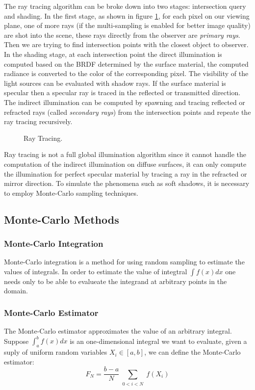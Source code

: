 The ray tracing algorithm can be broke down into two stages: intersection query and shading. In the first stage, as shown in figure \ref{fig:ray_tracing}, for each pixel on our viewing plane, one of more rays (if the multi-sampling is enabled for better image quality) are shot into the scene, these rays directly from the observer are \emph{primary rays}. Then we are trying to find intersection points with the closest object to observer. In the shading stage, at each intersection point the direct illumination is computed based on the BRDF determined by the surface material, the computed radiance is converted to the color of the corresponding pixel. The visibility of the light sources can be evaluated with shadow rays. If the surface material is specular then a specular ray is traced in the reflected or transmitted direction. The indirect illumination can be computed by spawning and tracing reflected or refracted rays (called \emph{secondary rays}) from the intersection points and repeate the ray tracing recursively. 

\begin{figure}[htp] 
    \centering 
    \renewcommand{\thefigure}{\thechapter.\arabic{figure}}
    \caption[]{Ray Tracing.}
    \label{fig:ray_tracing} 
\end{figure} 

Ray tracing is not a full global illumination algorithm since it cannot handle the computation of the indirect illumination on diffuse surfaces, it can only compute the illumination for perfect specular material by tracing a ray in the refracted or mirror direction. To simulate the phenomena such as soft shadows, it is necessary to employ Monte-Carlo sampling techniques. 

\subsection{Monte-Carlo Methods}

\subsubsection{Monte-Carlo Integration} 
Monte-Carlo integration is a method for using random sampling to estimate the values of integrals. In order to estimate the value of integtral \( \int f(x)dx \) one needs only to be able to evalueate the integrand at arbitrary points in the domain. 

\subsubsection{Monte-Carlo Estimator} 
The Monte-Carlo estimator approximates the value of an arbitrary integral. Suppose \( \int_{a}^{b}f(x)dx \) is an one-dimensional integral we want to evaluate, given a suply of uniform random variables \( X_{i} \in [a, b] \), we can define the Monte-Carlo estimator: 
\begin{equation}
F_{N} = \frac{b-a}{N}\sum_{\substack{0<i<N}}f(X_{i})
\end{equation}

